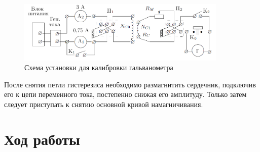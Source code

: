 \documentclass[a4paper]{article}
\begin{document}
\begin{figure}[h]
    \centering
    \includegraphics[width=10cm]{fig3.PNG}
    \caption{Схема установки для калибровки гальванометра}
    \label{fig:vac1}
\end{figure}

После снятия петли гистерезиса необходимо размагнитить сердечник, подключив его к цепи переменного тока, постепенно снижая его амплитуду. Только затем следует приступать к снятию основной кривой намагничивания.

\section{Ход работы}
\end{document}

